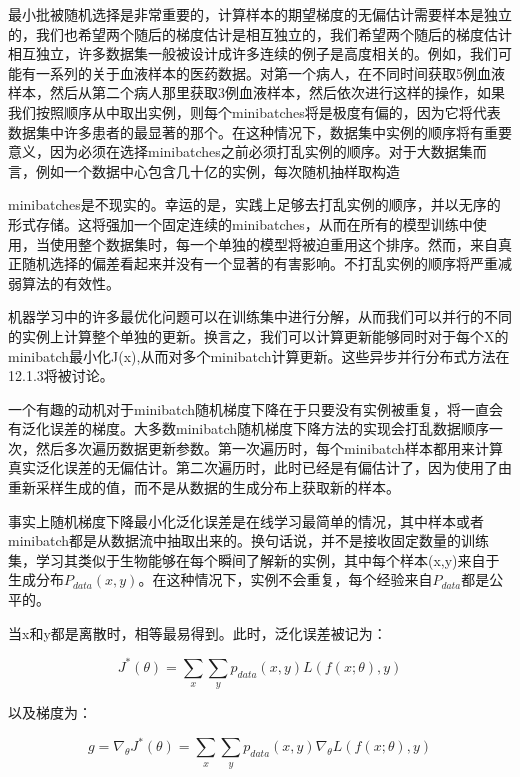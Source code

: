 最小批被随机选择是非常重要的，计算样本的期望梯度的无偏估计需要样本是独立的，我们也希望两个随后的梯度估计是相互独立的，我们希望两个随后的梯度估计相互独立，许多数据集一般被设计成许多连续的例子是高度相关的。例如，我们可能有一系列的关于血液样本的医药数据。对第一个病人，在不同时间获取5例血液样本，然后从第二个病人那里获取3例血液样本，然后依次进行这样的操作，如果我们按照顺序从中取出实例，则每个minibatches将是极度有偏的，因为它将代表数据集中许多患者的最显著的那个。在这种情况下，数据集中实例的顺序将有重要意义，因为必须在选择minibatches之前必须打乱实例的顺序。对于大数据集而言，例如一个数据中心包含几十亿的实例，每次随机抽样取构造

minibatches是不现实的。幸运的是，实践上足够去打乱实例的顺序，并以无序的形式存储。这将强加一个固定连续的minibatches，从而在所有的模型训练中使用，当使用整个数据集时，每一个单独的模型将被迫重用这个排序。然而，来自真正随机选择的偏差看起来并没有一个显著的有害影响。不打乱实例的顺序将严重减弱算法的有效性。

机器学习中的许多最优化问题可以在训练集中进行分解，从而我们可以并行的不同的实例上计算整个单独的更新。换言之，我们可以计算更新能够同时对于每个X的minibatch最小化J(x),从而对多个minibatch计算更新。这些异步并行分布式方法在12.1.3将被讨论。

一个有趣的动机对于minibatch随机梯度下降在于只要没有实例被重复，将一直会有泛化误差的梯度。大多数minibatch随机梯度下降方法的实现会打乱数据顺序一次，然后多次遍历数据更新参数。第一次遍历时，每个minibatch样本都用来计算真实泛化误差的无偏估计。第二次遍历时，此时已经是有偏估计了，因为使用了由重新采样生成的值，而不是从数据的生成分布上获取新的样本。	

事实上随机梯度下降最小化泛化误差是在线学习最简单的情况，其中样本或者minibatch都是从数据流中抽取出来的。换句话说，并不是接收固定数量的训练集，学习其类似于生物能够在每个瞬间了解新的实例，其中每个样本(x,y)来自于生成分布$P_{data}(x,y)$。在这种情况下，实例不会重复，每个经验来自$P_{data}$都是公平的。

当x和y都是离散时，相等最易得到。此时，泛化误差被记为：

\begin{equation}
J^*(\theta)=\sum_x\sum_yp_{data}(x,y)L(f(x;\theta),y)
\end{equation}

以及梯度为：

\begin{equation}
g=\nabla_{\theta}J^*(\theta)=\sum_x\sum_yp_{data}(x,y)\nabla_{\theta}L(f(x;\theta),y)
\end{equation}

